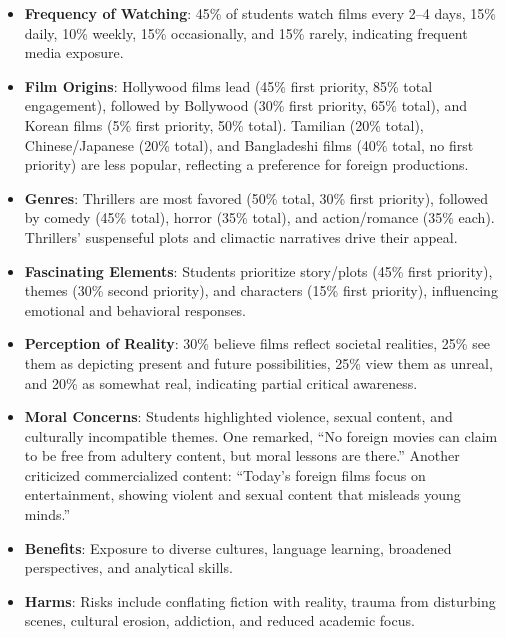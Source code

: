 \documentclass[12pt]{article}
\begin{document}
\begin{itemize}
  \item \textbf{Frequency of Watching}: 45\% of students watch films every 2–4 days, 15\% daily, 10\% weekly, 15\% occasionally, and 15\% rarely, indicating frequent media exposure.
  \item \textbf{Film Origins}: Hollywood films lead (45\% first priority, 85\% total engagement), followed by Bollywood (30\% first priority, 65\% total), and Korean films (5\% first priority, 50\% total). Tamilian (20\% total), Chinese/Japanese (20\% total), and Bangladeshi films (40\% total, no first priority) are less popular, reflecting a preference for foreign productions.
  \item \textbf{Genres}: Thrillers are most favored (50\% total, 30\% first priority), followed by comedy (45\% total), horror (35\% total), and action/romance (35\% each). Thrillers’ suspenseful plots and climactic narratives drive their appeal.
  \item \textbf{Fascinating Elements}: Students prioritize story/plots (45\% first priority), themes (30\% second priority), and characters (15\% first priority), influencing emotional and behavioral responses.
  \item \textbf{Perception of Reality}: 30\% believe films reflect societal realities, 25\% see them as depicting present and future possibilities, 25\% view them as unreal, and 20\% as somewhat real, indicating partial critical awareness.
  \item \textbf{Moral Concerns}: Students highlighted violence, sexual content, and culturally incompatible themes. One remarked, “No foreign movies can claim to be free from adultery content, but moral lessons are there.” Another criticized commercialized content: “Today’s foreign films focus on entertainment, showing violent and sexual content that misleads young minds.”
  \item \textbf{Benefits}: Exposure to diverse cultures, language learning, broadened perspectives, and analytical skills.
  \item \textbf{Harms}: Risks include conflating fiction with reality, trauma from disturbing scenes, cultural erosion, addiction, and reduced academic focus.
\end{itemize}
\end{document}
